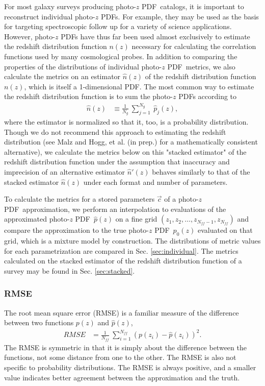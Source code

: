 \documentclass[\docopts]{\docclass}
\newcommand{\pz}{photo-$z$ PDF}
\begin{document}
For most galaxy surveys producing \pz\ catalogs, it is important to reconstruct 
individual \pz s.  For example, they may be used as the basis for targeting 
spectroscopic follow up for a variety of science applications.  However, \pz s 
have thus far been used almost exclusively to estimate the redshift 
distribution function $n(z)$ necessary for calculating the correlation 
functions used by many cosmological probes.  In addition to comparing the 
properties of the distributions of individual \pz\ metrics, we also calculate 
the metrics on an estimator $\hat{n}(z)$ of the redshift distribution function 
$n(z)$, which is itself a 1-dimensional PDF.  The most common way to estimate 
the redshift distribution function is to sum the \pz s according to
\begin{align}
  \label{eq:nz}
  \hat{n}(z) &\equiv \frac{1}{N_{g}}\ \sum_{j=1}^{N_{g}}\ \hat{p}_{j}(z),
\end{align}
where the estimator is normalized so that it, too, is a probability 
distribution.  Though we do not recommend this approach to estimating the 
redshift distribution (see Malz and Hogg, et al. (in prep.) for a 
mathematically consistent alternative), we calculate the metrics below on this 
"stacked estimator" of the redshift distribution function under the assumption 
that inaccuracy and imprecision of an alternative estimator $\hat{n}'(z)$ 
behaves similarly to that of the stacked estimator $\hat{n}(z)$ under each 
format and number of parameters.

To calculate the metrics for a stored parameters $\vec{c}$ of a \pz\ 
approximation, we perform an interpolation to evaluations of the approximated 
\pz\ $\hat{p}(z)$ on a fine grid $(z_{1}, z_{2}, \dots, z_{N_{ff}-1}, 
z_{N_{ff}})$ and compare the approximation to the true \pz\ $p_{0}(z)$ 
evaluated on that grid, which is a mixture model by construction.  The 
distributions of metric values for each parametrization are compared in Sec. 
\ref{sec:individual}.  The metrics calculated on the stacked estimator of the 
redshift distribution function of a survey may be found in Sec. 
\ref{sec:stacked}.

\subsubsection{RMSE}
\label{sec:rms}

The root mean square error (RMSE) is a familiar measure of the difference 
between two functions $p(z)$ and $\hat{p}(z)$,
\begin{align}
  \label{eq:rmse}
  RMSE &= \frac{1}{N_{ff}}\ \sum_{i=1}^{N_{ff}} (p(z_{i}) - \hat{p}(z_{i}))^{2}.
\end{align}
The RMSE is symmetric in that it is simply about the difference between the 
functions, not some distance from one to the other.  The RMSE is also not 
specific to probability distributions.  The RMSE is always positive, and a 
smaller value indicates better agreement between the approximation and the 
truth.
\end{document}
